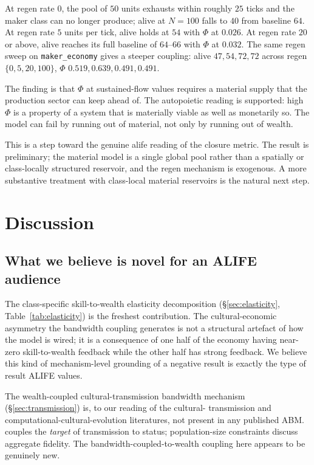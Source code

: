 \documentclass[11pt]{article}
\begin{document}
At regen rate $0$, the pool of $50$ units exhausts within roughly
$25$ ticks and the maker class can no longer produce; alive at
$N=100$ falls to $40$ from baseline $64$.  At regen rate $5$
units per tick, alive holds at $54$ with $\Phi$ at $0.026$.  At
regen rate $20$ or above, alive reaches its full baseline of
$64$--$66$ with $\Phi$ at $0.032$.  The same regen sweep on
\texttt{maker\_economy} gives a steeper coupling: alive $47, 54,
72, 72$ across regen $\{0, 5, 20, 100\}$, $\Phi$ $0.519, 0.639,
0.491, 0.491$.

The finding is that $\Phi$ at sustained-flow values requires a
material supply that the production sector can keep ahead of.
The autopoietic reading is supported: high $\Phi$ is a property of
a system that is materially viable as well as monetarily so.  The
model can fail by running out of material, not only by running out
of wealth.

This is a step toward the genuine alife reading of the closure
metric.  The result is preliminary; the material model is a single
global pool rather than a spatially or class-locally structured
reservoir, and the regen mechanism is exogenous.  A more
substantive treatment with class-local material reservoirs is the
natural next step.

\section{Discussion}
\label{sec:discussion}

\subsection{What we believe is novel for an ALIFE audience}

The class-specific skill-to-wealth elasticity decomposition
(\S\ref{sec:elasticity}, Table~\ref{tab:elasticity}) is the freshest
contribution. The cultural-economic asymmetry the bandwidth
coupling generates is not a structural artefact of how the model is
wired; it is a consequence of one half of the economy having near-
zero skill-to-wealth feedback while the other half has strong
feedback. We believe this kind of mechanism-level grounding of a
negative result is exactly the type of result ALIFE values.

The wealth-coupled cultural-transmission bandwidth mechanism
(\S\ref{sec:transmission}) is, to our reading of the cultural-
transmission and computational-cultural-evolution literatures, not
present in any published ABM. \citet{henrich2001evolution} couples
the \emph{target} of transmission to status; population-size
constraints \citep{henrich2004demography, lewis2012transmission}
discuss aggregate fidelity. The bandwidth-coupled-to-wealth coupling
here appears to be genuinely new.
\end{document}
